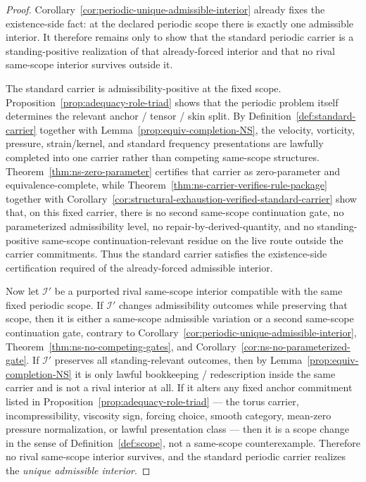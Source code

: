 \begin{proof}
Corollary~\ref{cor:periodic-unique-admissible-interior} already fixes the existence-side fact: at the
declared periodic scope there is exactly one admissible interior. It therefore remains only to show
that the standard periodic carrier is a standing-positive realization of that already-forced interior
and that no rival same-scope interior survives outside it.

The standard carrier is admissibility-positive at the fixed scope. Proposition~\ref{prop:adequacy-role-triad}
shows that the periodic problem itself determines the relevant anchor / tensor / skin split. By
Definition~\ref{def:standard-carrier} together with Lemma~\ref{prop:equiv-completion-NS}, the
velocity, vorticity, pressure, strain/kernel, and standard frequency presentations are lawfully
completed into one carrier rather than competing same-scope structures. Theorem~\ref{thm:ns-zero-parameter}
certifies that carrier as zero-parameter and equivalence-complete, while
Theorem~\ref{thm:ns-carrier-verifies-rule-package} together with
Corollary~\ref{cor:structural-exhaustion-verified-standard-carrier} show that, on this fixed
carrier, there is no second same-scope continuation gate, no parameterized admissibility level, no
repair-by-derived-quantity, and no standing-positive same-scope continuation-relevant residue on the live route outside the carrier commitments. Thus the standard carrier satisfies the existence-side certification required of the
already-forced admissible interior.

Now let $\mathcal I'$ be a purported rival same-scope interior compatible with the same fixed periodic
scope. If $\mathcal I'$ changes admissibility outcomes while preserving that scope, then it is either a
same-scope admissible variation or a second same-scope continuation gate, contrary to
Corollary~\ref{cor:periodic-unique-admissible-interior}, Theorem~\ref{thm:ns-no-competing-gates}, and
Corollary~\ref{cor:ns-no-parameterized-gate}. If $\mathcal I'$ preserves all standing-relevant outcomes,
then by Lemma~\ref{prop:equiv-completion-NS} it is only lawful bookkeeping / redescription inside the
same carrier and is not a rival interior at all. If it alters any fixed anchor commitment listed in
Proposition~\ref{prop:adequacy-role-triad} --- the torus carrier, incompressibility, viscosity sign,
forcing choice, smooth category, mean-zero pressure normalization, or lawful presentation class ---
then it is a scope change in the sense of Definition~\ref{def:scope}, not a same-scope counterexample.
Therefore no rival same-scope interior survives, and the standard periodic carrier realizes the
\emph{unique admissible interior}.
\end{proof}

